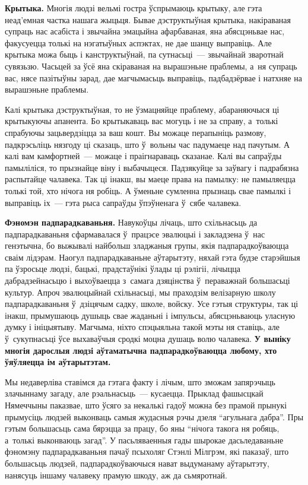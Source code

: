 \textbf{Крытыка.} Многія людзі вельмі гостра ўспрымаюць крытыку, але гэта неад'емная частка нашага жыцьця. Бывае дэструктыўная крытыка, накіраваная супраць нас асабіста і звычайна эмацыйна афарбаваная, яна абясцэньвае нас, факусуецца толькі на нэгатыўных аспэктах, не дае шанцу выправіць. Але крытыка можа быць і канструктыўнай, па сутнасьці~--- звычайнай зваротнай сувязьзю. Часьцей за ўсё яна скіраваная на вырашэньне праблемы, а~ня супраць вас, нясе пазітыўны зарад, дае магчымасьць выправіць, падбадзёрвае і натхняе на вырашэньне праблемы.

Калі крытыка дэструктыўная, то не ўзмацняйце праблему, абараняючыся ці крытыкуючы апанента. Бо крытыкаваць вас могуць і не за справу, а~толькі спрабуючы зацьвердзіцца за ваш кошт. Вы можаце перапыніць размову, падкрэсьліць нязгоду ці сказаць, што ў~вольны час падумаеце над пачутым. А калі вам камфортней~--- можаце і праігнараваць сказанае. Калі вы сапраўды памыліліся, то прызнайце віну і выбачыцеся. Падзякуйце за заўвагу і падрабязна распытайце чалавека. Так ці інакш, вы маеце права на памылку: не памыляецца толькі той, хто нічога ня робіць. А ўменьне сумленна прызнаць свае памылкі і выправіць іх~--- гэта рыса сапраўды ўпэўненага ў~сябе чалавека.


\textbf{Фэномэн падпарадкаваньня.} Навукоўцы лічаць, што схільнасьць да падпарадкаваньня сфармавалася ў~працэсе эвалюцыі і закладзена ў~нас генэтычна, бо выжывалі найбольш зладжаныя групы, якія падпарадкоўваюцца сваім лідэрам. Наогул падпарадкаваньне аўтарытэту, няхай гэта будзе старэйшыя па ўзросьце людзі, бацькі, прадстаўнікі ўлады ці рэлігіі, лічыцца дабрадзейнасьцю і выхоўваецца з~самага дзяцінства ў~пераважнай большасьці культур. Апроч эвалюцыйнай схільнасьці, мы праходзім велізарную школу падпарадкаваньня ў~дзіцячым садку, школе, войску. Усе гэтыя структуры, так ці інакш, прымушаюць душыць свае жаданьні і імпульсы, абясцэньваюць уласную думку і ініцыятыву. Магчыма, ніхто спэцыяльна такой мэты ня ставіць, але ў~сукупнасьці ўсе выхаваўчыя сродкі моцна душаць волю чалавека. \textbf{У выніку многія дарослыя людзі аўтаматычна падпарадкоўваюцца любому, хто ўяўляецца ім аўтарытэтам.}

Мы недаверліва ставімся да гэтага факту і лічым, што зможам запярэчыць злачыннаму загаду, але рэальнасьць~--- кусаецца. Прыклад фашысцкай Нямеччыны паказвае, што ўсяго за некалькі гадоў можна без прамой прынукі прымусіць людзей выконваць самыя жудасныя рэчы дзеля ``агульнага дабра''. Пры гэтым большасьць сама бярэцца за працу, бо яны ``нічога такога ня робяць, а~толькі выконваюць загад''. У пасьляваенныя гады шырокае дасьледаваньне фэномэну падпарадкаваньня пачаў псыхоляг Стэнлі Мілгрэм, які паказаў, што большасьць людзей, падпарадкоўваючыся нават выдуманаму аўтарытэту, нанясуць іншаму чалавеку прамую шкоду, аж да сьмяротнай.

